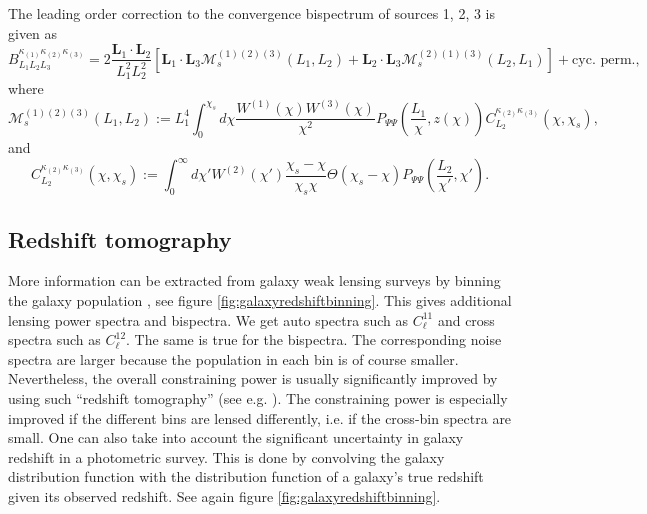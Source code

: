 \documentclass[11pt]{article} %
\begin{document}
The leading order correction to the convergence bispectrum of sources 1, 2, 3 is given as
\begin{equation}
    B^{\kappa_{(1)}\kappa_{(2)}\kappa_{(3)}}_{L_1 L_2 L_3} = 2\frac{\mathbf L_1\cdot\mathbf L_2}{L_1^2L_2^2}\left[ \mathbf L_1\cdot \mathbf L_3 \mathcal M_s^{(1)(2)(3)}(L_1,L_2)
 +\mathbf L_2\cdot \mathbf L_3 \mathcal M_s^{(2)(1)(3)}(L_2,L_1)\right] + \text{cyc. perm.},
\end{equation}
where
\begin{equation}
    \mathcal M_s^{(1)(2)(3)}(L_1,L_2) := L_1^4\int_0^{\chi_s}d\chi \frac{W^{(1)}(\chi)W^{(3)}(\chi)}{\chi^2} P_{\Psi\Psi}\left(\frac{L_1}{\chi}, z(\chi)\right) C_{L_2}^{\kappa_{(2)}\kappa_{(3)}}(\chi,\chi_s),
\end{equation}
and
\begin{equation}
    C_{L_2}^{\kappa_{(2)}\kappa_{(3)}}(\chi,\chi_s) := \int_0^{\infty}d \chi' W^{(2)}(\chi')\frac{\chi_s-\chi}{\chi_s\chi}\Theta(\chi_s-\chi)P_{\Psi\Psi}(\frac{L_2}{\chi'},\chi').
\end{equation}

\subsection{Redshift tomography}
More information can be extracted from galaxy weak lensing surveys by binning the galaxy population \cite{Hu_1999}, see figure \ref{fig:galaxyredshiftbinning}. This gives additional lensing power spectra and bispectra. We get auto spectra such as $C^{11}_{\ell}$ and cross spectra such as $C^{12}_{\ell}$. The same is true for the bispectra. The corresponding noise spectra are larger because the population in each bin is of course smaller. Nevertheless, the overall constraining power is usually significantly improved by using such ``redshift tomography'' (see e.g. \cite{Hu_1999}). The constraining power is especially improved if the different bins are lensed differently, i.e. if the cross-bin spectra are small. One can also take into account the significant uncertainty in galaxy redshift in a photometric survey. This is done by convolving the galaxy distribution function with the distribution function of a galaxy's true redshift given its observed redshift. See again figure \ref{fig:galaxyredshiftbinning}.
\end{document}
